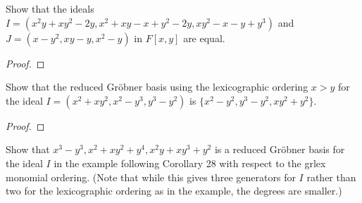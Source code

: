 \documentclass[10pt]{article}
\newenvironment{problem}[2][Problem]{\begin{trivlist}
		\item[\hskip \labelsep {\bfseries #1}\hskip \labelsep {\bfseries #2.}]}{\end{trivlist}}
\begin{document}
	\begin{problem}{6.23}
		Show that the ideals $I = (x^2y + xy^2 - 2y, x^2 + xy - x + y^2 - 2y , xy^2 - x - y + y^3 )$ and
		$J = (x - y^2 , xy - y, x^2 - y)$ in $F[x,y]$ are equal.
		\begin{proof}
			
		\end{proof}
	\end{problem}
	
	\begin{problem}{6.25}
		Show that the reduced Gr\"obner basis using the lexicographic ordering $x > y$ for the ideal $I = (x^2 + xy^2, x^2 - y^3, y^3 - y^2)$ is $\{x^2 - y^2, y^3 - y^2, xy^2 + y^2\}$.
		\begin{proof}
			
		\end{proof}
	\end{problem}
	
	\begin{problem}{6.27}
		Show that ${x^3 - y^3, x^2 +xy^2 + y^4 , x^2y +xy^3 + y^2}$ is a reduced Gr\"obner basis for the ideal $I$
		in the example following Corollary 28 with respect to the grlex monomial ordering. (Note
		that while this gives three generators for $I$ rather than two for the lexicographic ordering
		as in the example, the degrees are smaller.)
	\end{problem}
\end{document}
